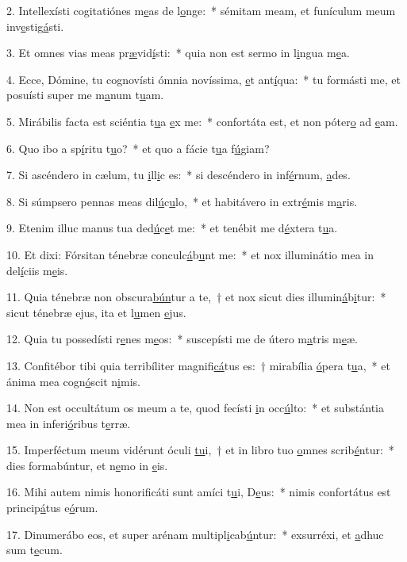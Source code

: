 2. Intellexísti cogitatiónes m\uline{e}as de l\uline{o}nge:~* sémitam meam, et funículum meum inv\uline{e}stig\uline{á}sti.\par 
3. Et omnes vias meas pr\uline{æ}vid\uline{í}sti:~* quia non est sermo in l\uline{i}ngua m\uline{e}a.\par 
4. Ecce, Dómine, tu cognovísti ómnia novíssima, \uline{e}t ant\uline{í}qua:~* tu formásti me, et posuísti super me m\uline{a}num t\uline{u}am.\par 
5. Mirábilis facta est sciéntia t\uline{u}a \uline{e}x me:~* confortáta est, et non póter\uline{o} ad \uline{e}am.\par 
6. Quo ibo a sp\uline{í}ritu t\uline{u}o?~* et quo a fácie t\uline{u}a f\uline{ú}giam?\par 
7. Si ascéndero in cælum, tu \uline{i}ll\uline{i}c es:~* si descéndero in inf\uline{é}rnum, \uline{a}des.\par 
8. Si súmpsero pennas meas dil\uline{ú}c\uline{u}lo,~* et habitávero in extr\uline{é}mis m\uline{a}ris.\par 
9. Etenim illuc manus tua ded\uline{ú}c\uline{e}t me:~* et tenébit me d\uline{é}xtera t\uline{u}a.\par 
10. Et dixi: Fórsitan ténebræ conculc\uline{á}b\uline{u}nt me:~* et nox illuminátio mea in del\uline{í}ciis m\uline{e}is.\par 
11. Quia ténebræ non obscura\uline{bún}tur a te,~† et nox sicut dies illumin\uline{á}b\uline{i}tur:~* sicut ténebræ ejus, ita et l\uline{u}men \uline{e}jus.\par 
12. Quia tu possedísti r\uline{e}nes m\uline{e}os:~* suscepísti me de útero m\uline{a}tris m\uline{e}æ.\par 
13. Confitébor tibi quia terribíliter magnifi\uline{cá}tus es:~† mirabília \uline{ó}pera t\uline{u}a,~* et ánima mea cogn\uline{ó}scit n\uline{i}mis.\par 
14. Non est occultátum os meum a te, quod fecísti \uline{i}n occ\uline{ú}lto:~* et substántia mea in inferi\uline{ó}ribus t\uline{e}rræ.\par 
15. Imperféctum meum vidérunt óculi \uline{tu}i,~† et in libro tuo \uline{o}mnes scrib\uline{é}ntur:~* dies formabúntur, et n\uline{e}mo in \uline{e}is.\par 
16. Mihi autem nimis honorificáti sunt amíci t\uline{u}i, D\uline{e}us:~* nimis confortátus est princip\uline{á}tus e\uline{ó}rum.\par 
17. Dinumerábo eos, et super arénam multipl\uline{i}cab\uline{ú}ntur:~* exsurréxi, et \uline{a}dhuc sum t\uline{e}cum.\par 
